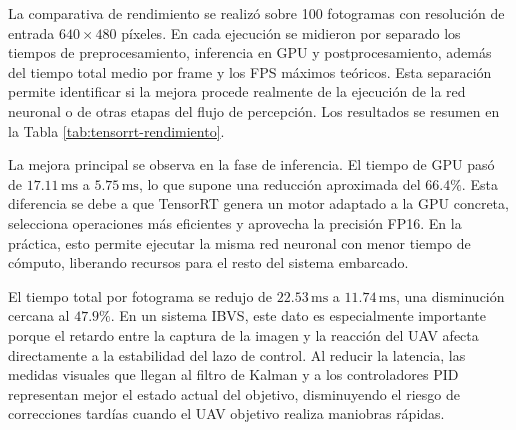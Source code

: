 \vspace{0.3cm}

La comparativa de rendimiento se realizó sobre 100 fotogramas con resolución de entrada $640 \times 480$ píxeles. En cada ejecución se midieron por separado los tiempos de preprocesamiento, inferencia en GPU y postprocesamiento, además del tiempo total medio por frame y los FPS máximos teóricos. Esta separación permite identificar si la mejora procede realmente de la ejecución de la red neuronal o de otras etapas del flujo de percepción. Los resultados se resumen en la Tabla \ref{tab:tensorrt-rendimiento}.

\begin{table}[H]
\centering
\caption{Comparativa de rendimiento antes y después de la optimización con TensorRT.}
\label{tab:tensorrt-rendimiento}
\begingroup
\footnotesize
\renewcommand{\arraystretch}{1.18}
\setlength{\tabcolsep}{6pt}
\endgroup
\end{table}

\vspace{0.3cm}

La mejora principal se observa en la fase de inferencia. El tiempo de GPU pasó de $17.11\,\mathrm{ms}$ a $5.75\,\mathrm{ms}$, lo que supone una reducción aproximada del $66.4\%$. Esta diferencia se debe a que TensorRT genera un motor adaptado a la GPU concreta, selecciona operaciones más eficientes y aprovecha la precisión FP16. En la práctica, esto permite ejecutar la misma red neuronal con menor tiempo de cómputo, liberando recursos para el resto del sistema embarcado.

\vspace{0.3cm}

El tiempo total por fotograma se redujo de $22.53\,\mathrm{ms}$ a $11.74\,\mathrm{ms}$, una disminución cercana al $47.9\%$. En un sistema IBVS, este dato es especialmente importante porque el retardo entre la captura de la imagen y la reacción del UAV afecta directamente a la estabilidad del lazo de control. Al reducir la latencia, las medidas visuales que llegan al filtro de Kalman y a los controladores PID representan mejor el estado actual del objetivo, disminuyendo el riesgo de correcciones tardías cuando el UAV objetivo realiza maniobras rápidas.

